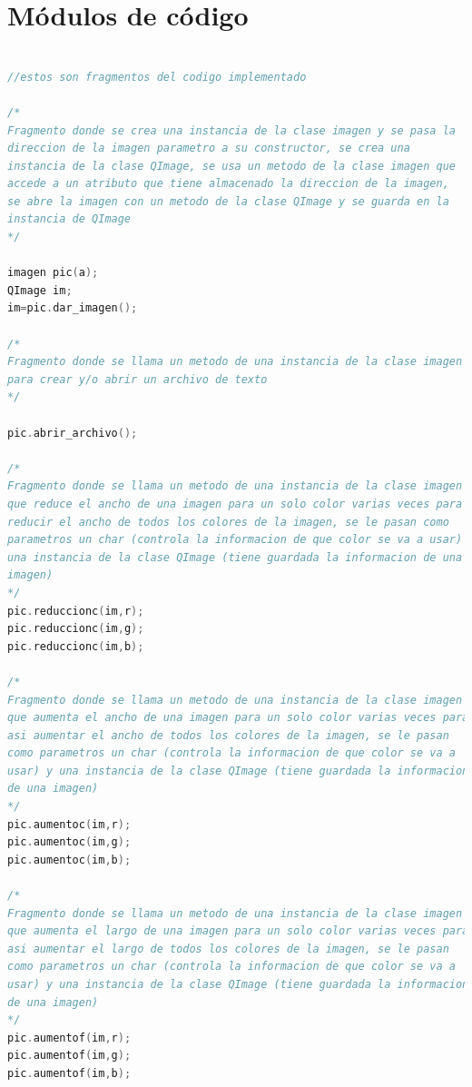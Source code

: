 \documentclass{article}
\begin{document}
	\section{Módulos de código}
	
\begin{lstlisting}[language=C++, label=codigo_ejemplo]

//estos son fragmentos del codigo implementado

/*
Fragmento donde se crea una instancia de la clase imagen y se pasa la
direccion de la imagen parametro a su constructor, se crea una
instancia de la clase QImage, se usa un metodo de la clase imagen que
accede a un atributo que tiene almacenado la direccion de la imagen,
se abre la imagen con un metodo de la clase QImage y se guarda en la
instancia de QImage
*/

imagen pic(a);
QImage im;
im=pic.dar_imagen();

/*
Fragmento donde se llama un metodo de una instancia de la clase imagen
para crear y/o abrir un archivo de texto
*/

pic.abrir_archivo();

/*
Fragmento donde se llama un metodo de una instancia de la clase imagen
que reduce el ancho de una imagen para un solo color varias veces para
reducir el ancho de todos los colores de la imagen, se le pasan como
parametros un char (controla la informacion de que color se va a usar) y
una instancia de la clase QImage (tiene guardada la informacion de una
imagen)
*/
pic.reduccionc(im,r);
pic.reduccionc(im,g);
pic.reduccionc(im,b);

/*
Fragmento donde se llama un metodo de una instancia de la clase imagen
que aumenta el ancho de una imagen para un solo color varias veces para
asi aumentar el ancho de todos los colores de la imagen, se le pasan
como parametros un char (controla la informacion de que color se va a
usar) y una instancia de la clase QImage (tiene guardada la informacion
de una imagen)
*/
pic.aumentoc(im,r);
pic.aumentoc(im,g);
pic.aumentoc(im,b);

/*
Fragmento donde se llama un metodo de una instancia de la clase imagen
que aumenta el largo de una imagen para un solo color varias veces para
asi aumentar el largo de todos los colores de la imagen, se le pasan
como parametros un char (controla la informacion de que color se va a
usar) y una instancia de la clase QImage (tiene guardada la informacion
de una imagen)
*/
pic.aumentof(im,r);
pic.aumentof(im,g);
pic.aumentof(im,b);


\end{lstlisting}
\end{document}
